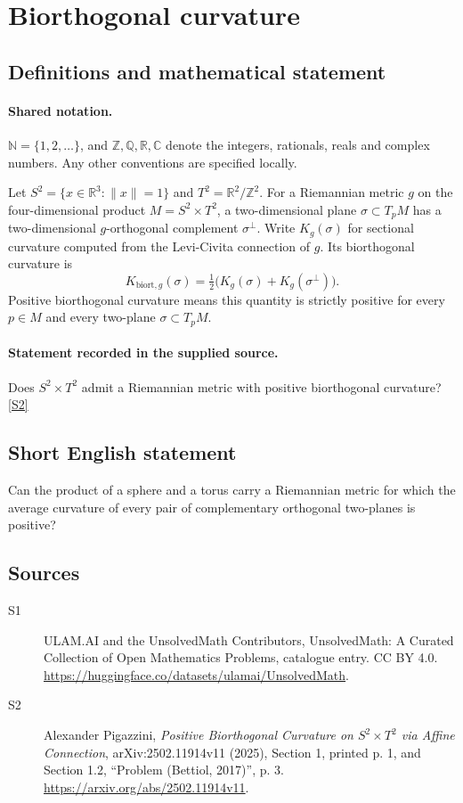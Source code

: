 \documentclass[11pt]{article}
\newcommand{\sref}[2]{\hyperlink{source:#1:#2}{[S#2]}}
\begin{document}
\section{Biorthogonal curvature}\label{statement}

\subsection{Definitions and mathematical statement}

\paragraph{Shared notation.}$\mathbb N=\{1,2,\ldots\}$, and $\mathbb Z,\mathbb Q,\mathbb R,\mathbb C$ denote the integers, rationals, reals and complex numbers. Any other conventions are specified locally.


Let $S^2=\{x\in\mathbb R^3:\lVert x\rVert=1\}$ and $T^2=\mathbb R^2/\mathbb Z^2$. For a Riemannian metric $g$ on the four-dimensional product $M=S^2\times T^2$, a two-dimensional plane $\sigma\subset T_pM$ has a two-dimensional $g$-orthogonal complement $\sigma^\perp$. Write $K_g(\sigma)$ for sectional curvature computed from the Levi-Civita connection of $g$. Its biorthogonal curvature is
\[K_{\mathrm{biort},g}(\sigma)=\tfrac12\bigl(K_g(\sigma)+K_g(\sigma^\perp)\bigr).\]
Positive biorthogonal curvature means this quantity is strictly positive for every $p\in M$ and every two-plane $\sigma\subset T_pM$.
\paragraph{Statement recorded in the supplied source.}
Does $S^2\times T^2$ admit a Riemannian metric with positive biorthogonal curvature? \sref{statement}{2}
\subsection{Short English statement}
Can the product of a sphere and a torus carry a Riemannian metric for which the average curvature of every pair of complementary orthogonal two-planes is positive?
\subsection{Sources}
\begin{description}
\item[\hypertarget{source:statement:1}{S1}] ULAM.AI and the UnsolvedMath Contributors, UnsolvedMath: A Curated Collection of Open Mathematics Problems, catalogue entry. CC BY 4.0. \url{https://huggingface.co/datasets/ulamai/UnsolvedMath}.
\item[\hypertarget{source:statement:2}{S2}] Alexander Pigazzini, \emph{Positive Biorthogonal Curvature on $S^2\times T^2$ via Affine Connection}, arXiv:2502.11914v11 (2025), Section 1, printed p. 1, and Section 1.2, ``Problem (Bettiol, 2017)'', p. 3. \url{https://arxiv.org/abs/2502.11914v11}.
\end{description}
\label{end:statement}
\end{document}
